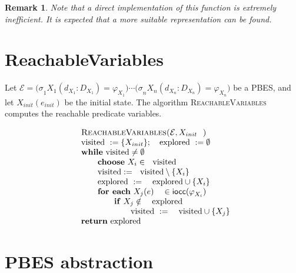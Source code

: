 \documentclass{article}
\newtheorem{remark}[theorem]{Remark}
\begin{document}
\begin{remark}
Note that a direct implementation of this function is extremely inefficient.
It is expected that a more suitable representation can be found.
\end{remark}

\section{\newpage ReachableVariables}

Let $\mathcal{E=(\sigma }_{1}X_{1}(d_{X_{1}}:D_{X_{1}})=\varphi
_{X_{1}})\cdots \mathcal{(\sigma }_{n}X_{n}(d_{X_{n}}:D_{X_{n}})=\varphi
_{X_{n}})$ be a PBES, and let $X_{init}(e_{init})$ be the initial state. The
algorithm \textsc{ReachableVariables} computes the reachable predicate
variables.

\begin{equation*}
\begin{array}{l}
\text{\textsc{ReachableVariables(}}\mathcal{E},X_{init}\text{\textsc{)}} \\ 
\text{visited }:=\{X_{init}\};\text{ explored }:=\emptyset  \\ 
\text{\textbf{while} visited}\neq \emptyset  \\ 
\qquad \text{\textbf{choose} }X_{i}\in \text{visited} \\ 
\qquad \text{visited}:=\text{visited}\setminus \{X_{i}\} \\ 
\qquad \text{explored }:=\text{ explored}\cup \{X_{i}\} \\ 
\qquad \text{\textbf{for each} }X_{j}(e)\text{ }\in \mathsf{iocc(}\varphi
_{X_{i}}{)} \\ 
\qquad \qquad \text{\textbf{if} }X_{j}\notin \text{ explored} \\ 
\qquad \qquad \qquad \text{visited }:=\text{ visited}\cup \{X_{j}\} \\ 
\text{\textbf{return} explored}%
\end{array}%
\end{equation*}%
\pagebreak 

\section{PBES abstraction}
\end{document}
